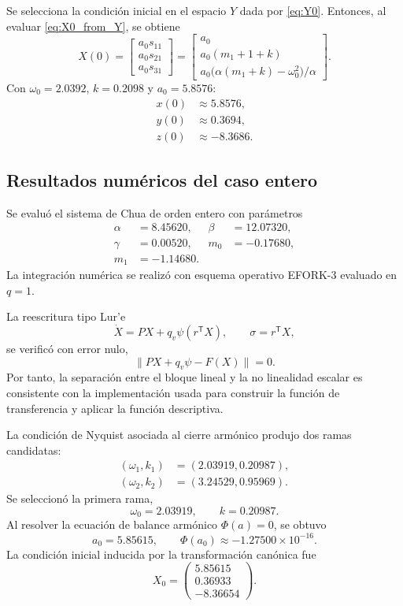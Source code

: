 \documentclass[journal]{IEEEtran}
\begin{document}
\noindent Se selecciona la condición inicial en el espacio $Y$ dada por \eqref{eq:Y0}. Entonces, al evaluar \eqref{eq:X0_from_Y}, se obtiene
\begin{equation}\label{eq:x0}
X(0)=
\begin{bmatrix}
a_0 s_{11}\\ a_0 s_{21}\\ a_0 s_{31}
\end{bmatrix}
=
\begin{bmatrix}
a_0\\
a_0(m_1+1+k)\\
a_0\big(\alpha(m_1+k)-\omega_0^2\big)/\alpha
\end{bmatrix}.
\end{equation}
Con $\omega_0=2.0392$, $k=0.2098$ y $a_0=5.8576$:
\[
\begin{aligned}
x(0)&\approx 5.8576,\\
y(0)&\approx 0.3694,\\
z(0)&\approx -8.3686.
\end{aligned}
\]

\subsection{Resultados numéricos del caso entero}

Se evaluó el sistema de Chua de orden entero con parámetros
\[
\begin{aligned}
\alpha &= 8.45620, & \beta &= 12.07320,\\
\gamma &= 0.00520, & m_0 &= -0.17680,\\
m_1 &= -1.14680.
\end{aligned}
\]
La integración numérica se realizó con esquema operativo EFORK-3 evaluado
en \(q=1\).

La reescritura tipo Lur'e
\[
\dot X=PX+q_v\psi(r^\mathsf{T}X),
\qquad
\sigma=r^\mathsf{T}X,
\]
se verificó con error nulo,
\[
\|PX+q_v\psi-F(X)\|=0.
\]
Por tanto, la separación entre el bloque lineal y la no linealidad escalar es
consistente con la implementación usada para construir la función de
transferencia y aplicar la función descriptiva.

La condición de Nyquist asociada al cierre armónico produjo dos ramas
candidatas:
\[
\begin{aligned}
(\omega_1,k_1) &= (2.03919,0.20987),\\
(\omega_2,k_2) &= (3.24529,0.95969).
\end{aligned}
\]
Se seleccionó la primera rama,
\[
\omega_0=2.03919,
\qquad
k=0.20987.
\]
Al resolver la ecuación de balance armónico \(\Phi(a)=0\), se obtuvo
\[
a_0=5.85615,
\qquad
\Phi(a_0)\approx -1.27500\times10^{-16}.
\]
La condición inicial inducida por la transformación canónica fue
\[
X_0=
\begin{pmatrix}
5.85615\\
0.36933\\
-8.36654
\end{pmatrix}.
\]
\end{document}
